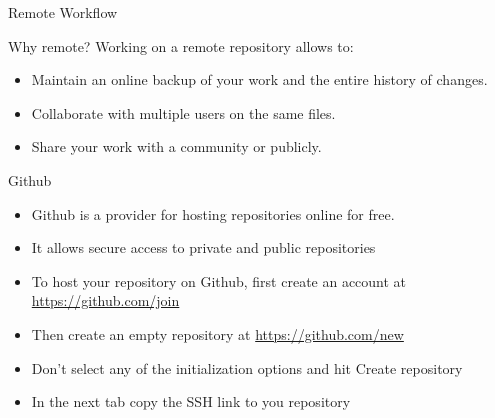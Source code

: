 \begin{frame}[fragile]{Remote Workflow}
\end{frame}

\begin{frame}[fragile]{Why remote?}
    Working on a remote repository allows to:
    \begin{itemize}[<+->]
        \item Maintain an online backup of your work and the entire history of changes.
        \item Collaborate with multiple users on the same files.
        \item Share your work with a community or publicly.
    \end{itemize}
\end{frame}

\begin{frame}[fragile]{Github}
    \begin{itemize}[<+->] 
        \item Github is a provider for hosting repositories online for free.
        \item It allows secure access to private and public repositories
        \item To host your repository on Github, first create an account at \url{https://github.com/join}
        \item Then create an empty repository at \url{https://github.com/new}
        \item Don't select any of the initialization options and hit \alert{Create repository}
        \item In the next tab copy the \alert{SSH} link to you repository
    \end{itemize}
\end{frame}

